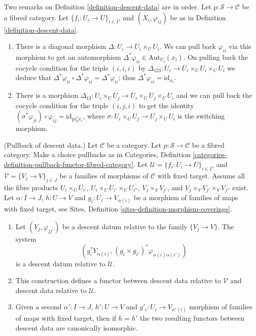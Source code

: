 \begin{remarks}
\label{remarks-definition-descent-datum}
Two remarks on Definition \ref{definition-descent-data} are in order.
Let $p : \mathcal{S} \to \mathcal{C}$ be a fibred category.
Let $\{f_i : U_i \to U\}_{i \in I}$, and $(X_i, \varphi_{ij})$
be as in Definition \ref{definition-descent-data}.
\begin{enumerate}
\item There is a diagonal morphism $\Delta : U_i \to U_i \times_U U_i$.
We can pull back $\varphi_{ii}$ via this morphism to get an automorphism
$\Delta^\ast \varphi_{ii} \in \text{Aut}_{U_i}(x_i)$.
On pulling back the cocycle condition for the triple $(i, i, i)$
by $\Delta_{123} : U_i \to U_i\times_U U_i \times_U U_i$ we deduce that
$\Delta^\ast \varphi_{ii} \circ \Delta^\ast \varphi_{ii} =
\Delta^\ast \varphi_{ii}$; thus $\Delta^\ast \varphi_{ii} =
\text{id}_{x_i}$.
\item There is a morphism
$\Delta_{13}: U_i \times_U U_j \to U_i \times_U U_j \times_U U_i$
and we can pull back the
cocycle condition for the triple $(i, j, i)$ to get the
identity $(\sigma^\ast \varphi_{ji}) \circ \varphi_{ij} =
\text{id}_{\text{pr}_0^\ast x_i}$, where
$\sigma: U_i \times_U U_j \to U_j \times_U U_i$ is the switching morphism.
\end{enumerate}
\end{remarks}

\begin{lemma}
\label{lemma-pullback}
(Pullback of descent data.)
Let $\mathcal{C}$ be a category.
Let $p : \mathcal{S} \to \mathcal{C}$ be a fibred category.
Make a choice pullbacks as in Categories,
Definition \ref{categories-definition-pullback-functor-fibred-category}.
Let $\mathcal{U} = \{f_i : U_i \to U\}_{i \in I}$, and
$\mathcal{V} = \{V_j \to V\}_{j \in J}$ 
be a families of morphisms of $\mathcal{C}$ with fixed target.
Assume all the fibre products
$U_i \times_U U_{i'}$, $U_i \times_U U_{i'} \times_U U_{i''}$,
$V_j \times_V V_{j'}$, and $V_j \times_V V_{j'} \times_V V_{j''}$ exist.
Let $\alpha : I \to J$, $h : U \to V$ and
$g_i : U_i \to V_{\alpha(i)}$ be a morphism of families
of maps with fixed target, see
Sites, Definition \ref{sites-definition-morphism-coverings}.
\begin{enumerate}
\item Let $(Y_j, \varphi_{jj'})$ be a descent datum relative to the
family $\{V_j \to V\}$. The system
$$
\left(
g_i^*Y_{\alpha(i)},
(g_i \times g_{i'})^*\varphi_{\alpha(i)\alpha(i')}
\right)
$$
is a descent datum relative to $\mathcal{U}$.
\item This construction defines a functor between descent data relative
to $\mathcal{V}$ and descent data relative to $\mathcal{U}$.
\item Given a second $\alpha' : I \to J$, $h' : U \to V$ and
$g'_i : U_i \to V_{\alpha'(i)}$ morphism of families
of maps with fixed target, then if $h = h'$ the two resulting functors
between descent data are canonically isomorphic.
\end{enumerate}
\end{lemma}

